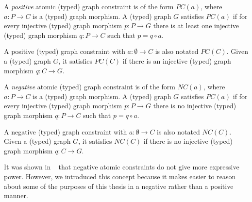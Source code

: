 \begin{definition} A \emph{positive} atomic (typed) graph constraint is of the form $PC\left(a\right)$, where $a : P \rightarrow C$ is a (typed) graph morphism. A (typed) graph $G$ satisfies $PC\left(a\right)$ if for every injective (typed) graph morphism $p : P \rightarrow G$ there is at least one injective (typed) graph morphism $q : P \rightarrow C$ such that $p = q \circ a$.

  A positive (typed) graph constraint with $a : \emptyset \rightarrow C$ is also notated $PC\left(C\right)$. Given a (typed) graph $G$, it satisfies $PC\left(C\right)$ if there is an injective (typed) graph morphism $q : C \rightarrow  G$.

\end{definition}

\begin{definition}
A \emph{negative} atomic (typed) graph constraint is of the form $NC\left(a\right)$, where $a : P \rightarrow C$ is a (typed) graph morphism. A (typed) graph $G$ satisfies $PC\left(a\right)$ if for every injective (typed) graph morphism $p : P \rightarrow G$ there is no injective (typed) graph morphism $q : P \rightarrow C$ such that $p = q \circ a$.

  A negative (typed) graph constraint with $a : \emptyset \rightarrow C$ is also notated $NC\left(C\right)$. Given a (typed) graph $G$, it satisfies $NC\left(C\right)$ if there is no injective (typed) graph morphism $q : C \rightarrow G$.


\end{definition}

\begin{remark} It was shown in ~\cite{Ehrig2006} that negative atomic constraints do not give more expressive power. However, we introduced this concept because it makes easier to reason about some of the purposes of this thesis in a negative rather than a positive manner.
\end{remark}

